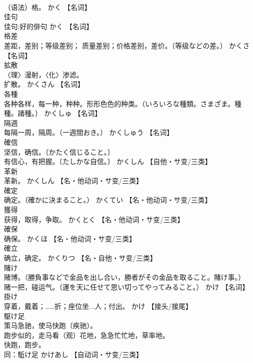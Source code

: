 \documentclass[8pt]{extreport}
\begin{document}
\begin{CJK}{UTF8}{min}
\\	（语法）格。	かく		【名词】
\\	佳句	
\\	佳句;好的俳句	かく		【名词】
\\	格差	
\\	差距，差别；等级差别； 质量差别；价格差别，差价。（等级などの差。）	かくさ		【名词】
\\	拡散	
\\	〈理〉漫射，〈化〉渗滤。 
\\	扩散。	かくさん		【名词】
\\	各種	
\\	各种各样，每一种，种种。形形色色的种类。（いろいろな種類。さまざま。種種。諸種。）	かくしゅ		【名词】
\\	隔週	
\\	每隔一周，隔周。（一週間おき。）	かくしゅう		【名词】
\\	確信	
\\	坚信，确信。〔かたく信じること。〕 
\\	有信心，有把握。〔たしかな自信。〕	かくしん		【自他・サ变/三类】
\\	革新	
\\	革新。	かくしん		【名・他动词・サ变/三类】
\\	確定	
\\	确定。（確かに決まること。）	かくてい		【名・他动词・サ变/三类】
\\	獲得	
\\	获得，取得，争取。	かくとく		【名・他动词・サ变/三类】
\\	確保	
\\	确保。	かくほ		【名・他动词・サ变/三类】
\\	確立	
\\	确立，确定。	かくりつ		【名・自他・サ变/三类】
\\	賭け	
\\	赌博。（勝負事などで金品を出し合い，勝者がその金品を取ること。賭け事。） 
\\	赌一把，碰运气。（運を天に任せて思い切ってやってみること。）	かけ		【名词】
\\	掛け	
\\	穿着，戴着；……折；座位坐...人；付出。	かけ		【接头/接尾】
\\	駆け足	
\\	策马急驰，使马快跑（疾驰）。 
\\	跑步似的，走马看（观）花地，急急忙忙地，草率地。 
\\	快跑，跑步。 
\\	同：駈け足	かけあし		【自动词・サ变/三类】

\end{CJK}
\end{document}
